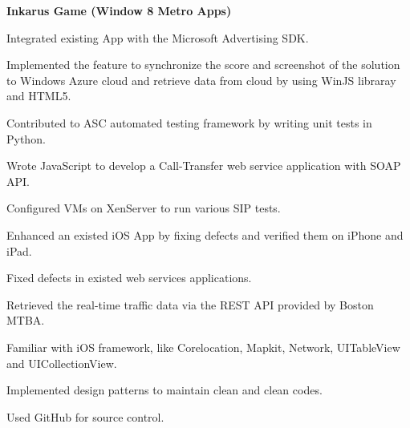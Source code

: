 \documentclass[a4paper]{lyu-resume} %
\begin{document}
\begin{minipage}[t]{0.66\textwidth}
\vspace{2 mm}
\textbf{Inkarus Game (Window 8 Metro Apps)}
\begin{tightitemize}
\item Integrated existing App with the Microsoft Advertising SDK.
\item Implemented the feature to synchronize the score and screenshot of the solution to Windows Azure cloud and retrieve data from cloud by using WinJS libraray and HTML5.
\end{tightitemize}

\sectionspace %



\begin{tightitemize}
\item Contributed to ASC automated testing framework by writing unit tests in Python.
\item Wrote JavaScript to develop a Call-Transfer web service application with SOAP API.
\item Configured VMs on XenServer to run various SIP tests.
\item Enhanced an existed iOS App by fixing defects and verified them on iPhone and iPad. 
\item Fixed defects in existed web services applications.
\end{tightitemize}


\begin{tightitemize}
\item Retrieved the real-time traffic data via the REST API provided by Boston MTBA.
\item Familiar with iOS framework, like Corelocation, Mapkit, Network, UITableView and UICollectionView.
\item Implemented design patterns to maintain clean and clean codes.
\item Used GitHub for source control.
\end{tightitemize}

\sectionspace %
\end{minipage} %
\end{document}
